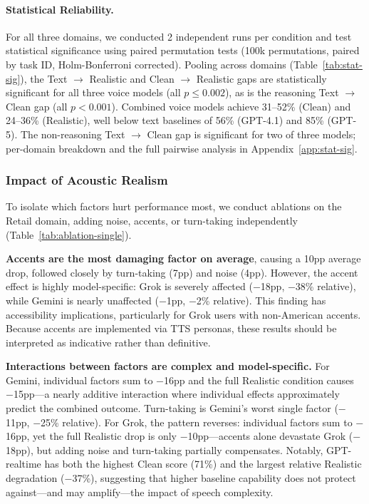 \paragraph{Statistical Reliability.} For all three domains, we conducted 2 independent runs per condition and test statistical significance using paired permutation tests (100k permutations, paired by task ID, Holm-Bonferroni corrected). Pooling across domains (Table~\ref{tab:stat-sig}), the Text $\to$ Realistic and Clean $\to$ Realistic gaps are statistically significant for all three voice models (all $p \le 0.002$), as is the reasoning Text $\to$ Clean gap (all $p < 0.001$). Combined voice models achieve 31--52\% (Clean) and 24--36\% (Realistic), well below text baselines of 56\% (GPT-4.1) and 85\% (GPT-5). The non-reasoning Text $\to$ Clean gap is significant for two of three models; per-domain breakdown and the full pairwise analysis in Appendix~\ref{app:stat-sig}.%

\subsubsection{Impact of Acoustic Realism}

To isolate which factors hurt performance most, we conduct ablations on the Retail domain, adding noise, accents, or turn-taking independently (Table~\ref{tab:ablation-single}).



\textbf{Accents are the most damaging factor on average}, causing a 10pp average drop, followed closely by turn-taking (7pp) and noise (4pp). However, the accent effect is highly model-specific: Grok is severely affected ($-$18pp, $-$38\% relative), while Gemini is nearly unaffected ($-$1pp, $-$2\% relative). This finding has accessibility implications, particularly for Grok users with non-American accents. Because accents are implemented via TTS personas, these results should be interpreted as indicative rather than definitive.

\textbf{Interactions between factors are complex and model-specific.} For Gemini, individual factors sum to $-$16pp and the full Realistic condition causes $-$15pp---a nearly additive interaction where individual effects approximately predict the combined outcome. Turn-taking is Gemini's worst single factor ($-$11pp, $-$25\% relative). For Grok, the pattern reverses: individual factors sum to $-$16pp, yet the full Realistic drop is only $-$10pp---accents alone devastate Grok ($-$18pp), but adding noise and turn-taking partially compensates. Notably, GPT-realtime has both the highest Clean score (71\%) and the largest relative Realistic degradation ($-$37\%), suggesting that higher baseline capability does not protect against---and may amplify---the impact of speech complexity.

